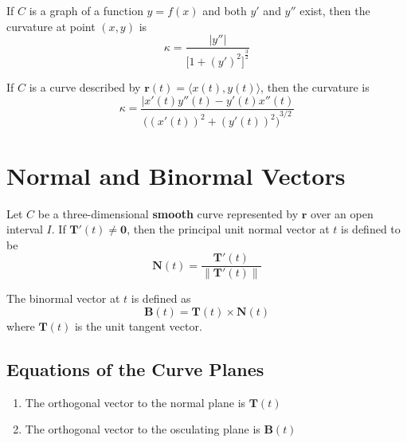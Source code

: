 \documentclass{article}
\begin{document}
If $C$ is a graph of a function $y=f(x)$ and both $y'$ and $y''$ exist, then the curvature at point $(x, y)$ is
\[\kappa = \frac{|y''|}{{\Big[1+{(y')}^2\Big]}^\frac{3}{2}}\]

If $C$ is a curve described by $\mathbf{r}(t)=\langle x(t), y(t) \rangle$, then the curvature is
\[\kappa = \frac{|x'(t)y''(t)-y'(t)x''(t)}{{\Big({(x'(t))}^2+{(y'(t))}^2\Big)}^{3/2}}\]

\section*{Normal and Binormal Vectors}

Let $C$ be a three-dimensional \textbf{smooth} curve represented by $\mathbf{r}$ over an open interval $I$. If $\mathbf{T}'(t)\neq\mathbf{0}$, then the principal unit normal vector at $t$ is defined to be
\[\mathbf{N}(t)=\frac{\mathbf{T}'(t)}{\|\mathbf{T}'(t)\|}\]

The binormal vector at $t$ is defined as
\[\mathbf{B}(t)=\mathbf{T}(t)\times\mathbf{N}(t)\]
where $\mathbf{T}(t)$ is the unit tangent vector.

\subsection*{Equations of the Curve Planes}
\begin{enumerate}
    \item The orthogonal vector to the normal plane is $\mathbf{T}(t)$
    \item The orthogonal vector to the osculating plane is $\mathbf{B}(t)$
\end{enumerate}
\end{document}
